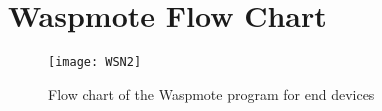 \clearpage
\section{Waspmote Flow Chart}
\label{AppendixE} %
\begin{figure}[htbp]
\centering
\texttt{[image: WSN2]}
\caption{Flow chart of the Waspmote program for end devices}
\label{fig:flow}
\end{figure}
